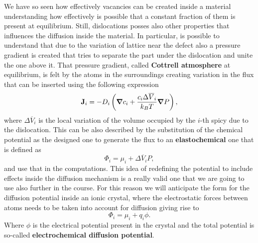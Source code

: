 We have so seen how effectively vacancies can be created inside a material understanding how effectively is possible that a constant fraction of them is present at equilibrium. Still, dislocations posses also other properties that influences the diffusion inside the material. In particular, is possible to understand that due to the variation of lattice near the defect also a pressure gradient is created that tries to separate the part under the dislocation and unite the one above it. That pressure gradient, called \textbf{Cottrell atmosphere} at equilibrium, is felt by the atoms in the surroundings creating variation in the flux that can be inserted using the following expression
\begin{equation}
    \vb{J}_i = -D_i\left( \grad c_i + \frac{c_i \Delta \overline{V}_i}{k_BT}\grad P \right),
\end{equation}
where $\Delta \overline{V}_i$ is the local variation of the volume occupied by the $i$-th spicy due to the dislocation. This can be also described by the substitution of the chemical potential as the designed one to generate the flux to an \textbf{elastochemical} one that is defined as
\begin{equation}
    \Phi_i = \mu_i + \Delta \overline{V}_i P,
\end{equation}
and use that in the computations. This idea of redefining the potential to include effects inside the diffusion mechanism is a really valid one that we are going to use also further in the course. For this reason we will anticipate the form for the diffusion potential inside an ionic crystal, where the electrostatic forces between atoms needs to be taken into account for diffusion giving rise to
\begin{equation}
    \Phi_i = \mu_i + q_i\phi.
\end{equation}
Where $\phi$ is the electrical potential present in the crystal and the total potential is so-called \textbf{electrochemical diffusion potential}.